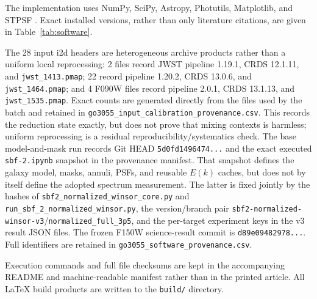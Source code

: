 \documentclass[nodoi,nocopyright]{pas}
\newcommand{\papertable}[2]{%
  \sbox{\papertablebox}{\tablefont\setlength{\tabcolsep}{4pt}#2}%
  \ifdim\wd\papertablebox>#1\relax
    \resizebox{#1}{!}{\usebox{\papertablebox}}%
  \else\usebox{\papertablebox}\fi
}
\begin{document}
\begin{table}[!tbp]
\centering
\caption{Software versions, processing contract, and Git revision identifiers.
Git identifiers are abbreviated; file SHA256 checksums are omitted from
print and retained in the machine-readable provenance manifest.}
\label{tab:software}
\papertable{\textwidth}{%
}
\end{table}

The implementation uses NumPy, SciPy, Astropy, Photutils, Matplotlib, and
STPSF \citep{Harris2020,Virtanen2020,Astropy2013,Astropy2018,Astropy2022,
Hunter2007,Perrin2014}. Exact installed versions, rather than only literature
citations, are given in Table~\ref{tab:software}.

The 28 input i2d headers are heterogeneous archive products rather than a
uniform local reprocessing: 2 files record JWST pipeline 1.19.1, CRDS 12.1.11,
and \nolinkurl{jwst_1413.pmap}; 22 record pipeline 1.20.2, CRDS 13.0.6, and
\nolinkurl{jwst_1464.pmap}; and 4 F090W files record pipeline 2.0.1, CRDS
13.1.13, and \nolinkurl{jwst_1535.pmap}. Exact counts are generated directly
from the files used by the batch and retained in
\nolinkurl{go3055_input_calibration_provenance.csv}. This records the reduction
state exactly, but does not prove that mixing contexts is harmless; uniform
reprocessing is a residual reproducibility/systematics check. The base
model-and-mask run records Git HEAD \texttt{5d0fd1496474...} and the exact
executed \nolinkurl{sbf-2.ipynb} snapshot in the provenance manifest. That snapshot
defines the galaxy model, masks, annuli, PSFs, and reusable $E(k)$ caches, but
does not by itself define the adopted spectrum measurement. The latter is
fixed jointly by the hashes of \nolinkurl{sbf2_normalized_winsor_core.py} and
\nolinkurl{run_sbf_2_normalized_winsor.py}, the version/branch pair
\texttt{sbf2-normalized-winsor-v3}/\texttt{normalized\_full\_3p5}, and the
per-target experiment keys in the v3 result JSON files. The frozen F150W
science-result commit is \texttt{d89e09482978...}. Full identifiers are
retained in \nolinkurl{go3055_software_provenance.csv}.

Execution commands and full file checksums are kept in the accompanying
README and machine-readable manifest rather than in the printed article.
All \LaTeX{} build products are written to the \nolinkurl{build/} directory.
\end{document}
